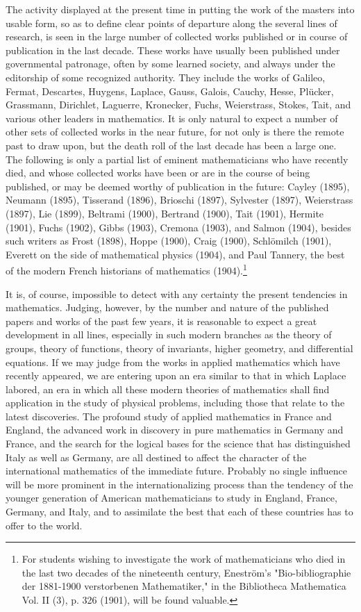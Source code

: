 \documentclass[oneside]{book}
\begin{document}
{The activity displayed at the present time in putting the
work of the masters into usable form, so as to define clear points
of departure along the several lines of research, is seen in the
large number of collected works published or in course of publication
in the last decade. These works have usually been
published under governmental patronage, often by some learned
society, and always under the editorship of some recognized
authority. They include the works of Galileo, Fermat, Descartes,
Huygens, Laplace, Gauss, Galois, Cauchy, Hesse, Pl\"ucker,
Grassmann, Dirichlet, Laguerre, Kronecker, Fuchs, Weierstrass,
Stokes, Tait, and various other leaders in mathematics. It is
only natural to expect a number of other sets of collected works
in the near future, for not only is there the remote past to draw
upon, but the death roll of the last decade has been a large one.
The following is only a partial list of eminent mathematicians
who have recently died, and whose collected works have been
or are in the course of being published, or may be deemed worthy
of publication in the future: Cayley (1895), Neumann (1895),
Tisserand (1896), Brioschi (1897), Sylvester (1897), Weierstrass
(1897), Lie (1899), Beltrami (1900), Bertrand (1900), Tait (1901),
Hermite (1901), Fuchs (1902), Gibbs (1903), Cremona (1903),
and Salmon (1904), besides such writers as Frost (1898), Hoppe
(1900), Craig (1900), Schl\"omilch (1901), Everett on the side of
mathematical physics (1904), and Paul Tannery, the best of
the modern French historians of mathematics (1904).\footnote{For
students wishing to investigate the work of mathematicians who died
in the last two decades of the nineteenth century, Enestr\"om's "Bio-bibliographie
der 1881-1900 verstorbenen Mathematiker," in the Bibliotheca Mathematica
Vol. II (3), p. 326 (1901), will be found valuable.}

It is, of course, impossible to detect with any certainty the
present tendencies in mathematics. Judging, however, by the
number and nature of the published papers and works of the
past few years, it is reasonable to expect a great development in
all lines, especially in such modern branches as the theory of
groups, theory of functions, theory of invariants, higher geometry,
and differential equations. If we may judge from the works in
applied mathematics which have recently appeared, we are
entering upon an era similar to that in which Laplace labored,
an era in which all these modern theories of mathematics shall
find application in the study of physical problems, including
those that relate to the latest discoveries. The profound study
of applied mathematics in France and England, the advanced
work in discovery in pure mathematics in Germany and France,
and the search for the logical bases for the science that has distinguished
Italy as well as Germany, are all destined to affect the
character of the international mathematics of the immediate
future. Probably no single influence will be more prominent
in the internationalizing process than the tendency of the younger
generation of American mathematicians to study in England,
France, Germany, and Italy, and to assimilate the best that each
of these countries has to offer to the world.

}
\end{document}
